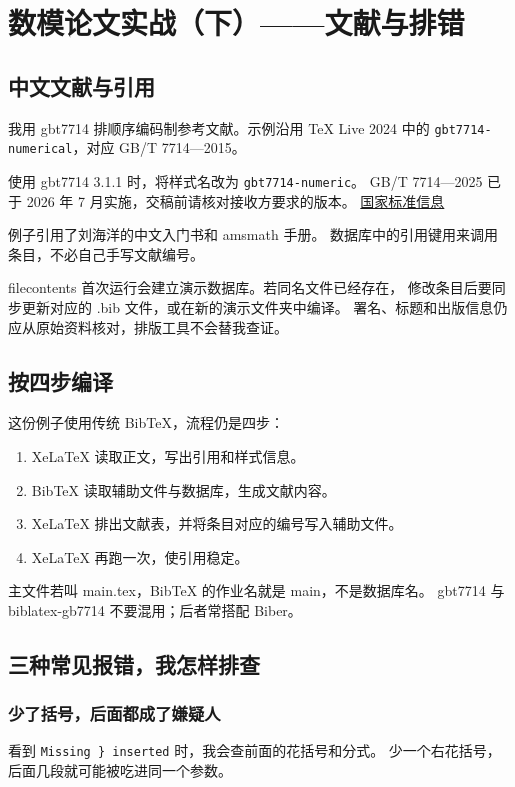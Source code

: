 \chapter{数模论文实战（下）——文献与排错}

\section{中文文献与引用}
我用 gbt7714 排顺序编码制参考文献。示例沿用 TeX Live 2024 中的
\texttt{gbt7714-numerical}，对应 GB/T 7714—2015。

使用 gbt7714 3.1.1 时，将样式名改为 \texttt{gbt7714-numeric}。
GB/T 7714—2025 已于 2026 年 7 月实施，交稿前请核对接收方要求的版本。
\href{https://std.samr.gov.cn/gb/search/gbDetailed?id=4507EFE13D37CB6AE06397BE0A0A601F}{国家标准信息}

例子引用了刘海洋的中文入门书\cite{liu2013}和 amsmath 手册\cite{amsmathGuide}。
数据库中的引用键用来调用条目，不必自己手写文献编号。

filecontents 首次运行会建立演示数据库。若同名文件已经存在，
修改条目后要同步更新对应的 .bib 文件，或在新的演示文件夹中编译。
署名、标题和出版信息仍应从原始资料核对，排版工具不会替我查证。

\section{按四步编译}
这份例子使用传统 BibTeX，流程仍是四步：
\begin{enumerate}
  \item XeLaTeX 读取正文，写出引用和样式信息。
  \item BibTeX 读取辅助文件与数据库，生成文献内容。
  \item XeLaTeX 排出文献表，并将条目对应的编号写入辅助文件。
  \item XeLaTeX 再跑一次，使引用稳定。
\end{enumerate}
主文件若叫 main.tex，BibTeX 的作业名就是 main，不是数据库名。
gbt7714 与 biblatex-gb7714 不要混用；后者常搭配 Biber。



\section{三种常见报错，我怎样排查}
\subsection{少了括号，后面都成了嫌疑人}
看到 \verb|Missing } inserted| 时，我会查前面的花括号和分式。
少一个右花括号，后面几段就可能被吃进同一个参数。

